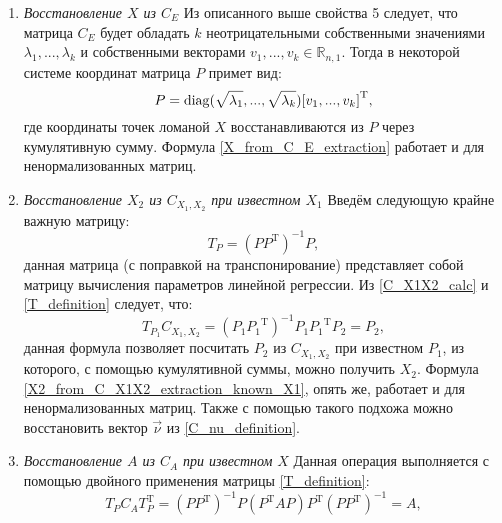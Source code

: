 \begin{enumerate}
\item \textit{Восстановление $X$ из $C_E$}
Из описанного выше свойства 5 следует, что матрица $C_E$ будет обладать $k$ неотрицательными собственными значениями $\lambda_1, ..., \lambda_k$ и собственными векторами $v_1, ..., v_k \in \mathbb{R}_{n,1}$. Тогда в некоторой системе координат матрица $P$ примет вид:
\begin{equation}
	P = \operatorname{diag}(\sqrt{\lambda_1}, ..., \sqrt{\lambda_k}){[v_1, ..., v_k]}^\mathrm{T},
	\label{X_from_C_E_extraction}
\end{equation}
где координаты точек ломаной $X$ восстанавливаются из $P$ через кумулятивную сумму. Формула \ref{X_from_C_E_extraction} работает и для ненормализованных матриц.

\item \textit{Восстановление $X_2$ из $C_{X_1, X_2}$ при известном $X_1$}
Введём следующую крайне важную матрицу:
\begin{equation}
	T_P = {(P{P}^\mathrm{T})}^{-1}P,
	\label{T_definition}
\end{equation}
данная матрица (с поправкой на транспонирование) представляет собой матрицу вычисления параметров линейной регрессии. Из \ref{C_X1X2_calc} и \ref{T_definition} следует, что:
\begin{equation}
	T_{P_1}C_{X_1, X_2} = {(P_1{P_1}^\mathrm{T})}^{-1}P_1{P_1}^\mathrm{T}{P_2} = P_2,
	\label{X2_from_C_X1X2_extraction_known_X1}
\end{equation}
данная формула позволяет посчитать $P_2$ из $C_{X_1, X_2}$ при известном $P_1$, из которого, с помощью кумулятивной суммы, можно получить $X_2$. Формула \ref{X2_from_C_X1X2_extraction_known_X1}, опять же, работает и для ненормализованных матриц. Также с помощью такого подхожа можно восстановить вектор $\vec{\nu}$ из
\ref{C_nu_definition}.

\item \textit{Восстановление $A$ из $C_A$ при известном $X$}
Данная операция выполняется с помощью двойного применения матрицы \ref{T_definition}:
\begin{equation}
	T_PC_AT_P^\mathrm{T} = {(PP^\mathrm{T})}^{-1}P(P^\mathrm{T}AP)P^\mathrm{T}{(PP^\mathrm{T})}^{-1} = A,
	\label{A_from_C_A_extraction_known_X}
\end{equation}


\end{enumerate}
